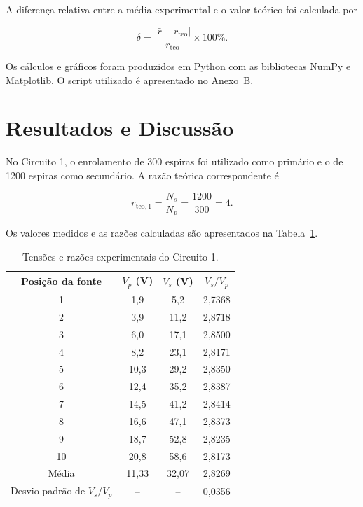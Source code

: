 \documentclass[a4paper,12pt]{article}
\begin{document}
A diferença relativa entre a média experimental e o valor teórico foi calculada
por

\begin{equation}
  \delta=\frac{|\bar r-r_{\mathrm{teo}}|}{r_{\mathrm{teo}}}\times100\%.
  \label{eq:diferenca}
\end{equation}

Os cálculos e gráficos foram produzidos em Python com as bibliotecas NumPy e
Matplotlib. O script utilizado é apresentado no Anexo~B.

\section{Resultados e Discussão}

No Circuito 1, o enrolamento de 300 espiras foi utilizado como primário e o de
1200 espiras como secundário. A razão teórica correspondente é

\begin{equation}
  r_{\mathrm{teo},1}=\frac{N_s}{N_p}
  =\frac{1200}{300}=4.
  \label{eq:teorica1}
\end{equation}

Os valores medidos e as razões calculadas são apresentados na
Tabela~\ref{tab:circuito1}.

\begin{table}[H]
  \centering
  \caption{Tensões e razões experimentais do Circuito 1.}
  \label{tab:circuito1}
  \medskip
  \begin{tabular}{cccc}
    \toprule
    Posição da fonte & $V_p$ (V) & $V_s$ (V) & $V_s/V_p$ \\
    \midrule
     1 &  1,9 &  5,2 & 2,7368 \\
     2 &  3,9 & 11,2 & 2,8718 \\
     3 &  6,0 & 17,1 & 2,8500 \\
     4 &  8,2 & 23,1 & 2,8171 \\
     5 & 10,3 & 29,2 & 2,8350 \\
     6 & 12,4 & 35,2 & 2,8387 \\
     7 & 14,5 & 41,2 & 2,8414 \\
     8 & 16,6 & 47,1 & 2,8373 \\
     9 & 18,7 & 52,8 & 2,8235 \\
    10 & 20,8 & 58,6 & 2,8173 \\
    \midrule
    Média & 11,33 & 32,07 & 2,8269 \\
    Desvio padrão de $V_s/V_p$ & -- & -- & 0,0356 \\
    \bottomrule
  \end{tabular}
\end{table}
\end{document}
